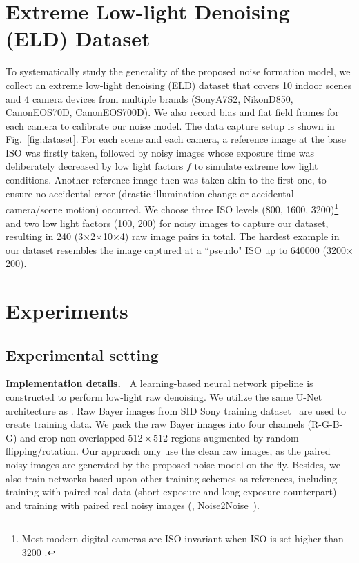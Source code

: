 \documentclass[10pt,twocolumn,letterpaper]{article}
\begin{document}
\section{Extreme Low-light Denoising (ELD) Dataset} \label{sec:eld-dataset}
To systematically study the generality of the proposed noise formation model, 
we collect an extreme low-light denoising (ELD) dataset that covers 10 indoor
scenes and 4 camera devices from multiple brands (SonyA7S2, NikonD850, CanonEOS70D, CanonEOS700D). We also record bias and flat field frames for each camera to calibrate our noise model. 
The data capture setup is shown in Fig.~\ref{fig:dataset}. 
For each scene and each camera, a reference image at the base ISO was firstly taken, followed by noisy images whose exposure time was deliberately decreased by low light factors $f$ to simulate extreme low light conditions.  Another reference image then was taken akin to the first one, to ensure no accidental error (\eg drastic illumination change or accidental camera/scene motion) occurred.
We  choose three ISO levels (800, 1600, 3200)\footnote{Most modern digital cameras are ISO-invariant when ISO is set higher than 3200 \cite{ISOless_Clark}.} and two low light factors (100, 200) for noisy images to capture our dataset, resulting in 240 (3$\times$2$\times$10$\times$4) raw image pairs in total. The hardest example in our dataset resembles the image captured at a ``pseudo" ISO up to 640000 (3200$\times$200).

\section{Experiments}

\subsection{Experimental setting} \label{sec:implementation-details}
\noindent\textbf{Implementation details.~}
A learning-based neural network pipeline is constructed to perform low-light raw denoising. We utilize the same U-Net architecture  \cite{ronneberger2015u} as \cite{Chen_2018_CVPR}.
Raw Bayer images from SID Sony training
dataset~\cite{Chen_2018_CVPR} are used to create training data. We pack the raw Bayer images into four channels (R-G-B-G) and crop non-overlapped $512\times 512$ regions augmented by random flipping/rotation.
Our approach only use the clean raw images, as the paired noisy images are generated by the proposed noise model on-the-fly.
Besides, we also train networks based upon other training schemes as references, including training with paired real data (short exposure and long exposure counterpart) and training with paired real noisy images (\ie, Noise2Noise~\cite{pmlr-v80-lehtinen18a}).
\end{document}
